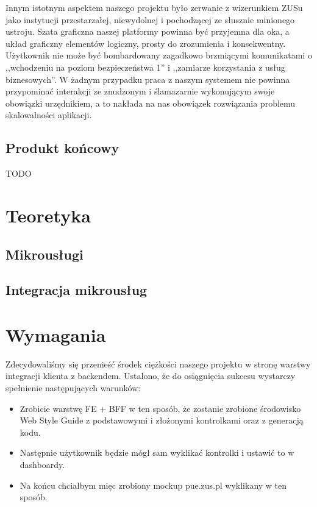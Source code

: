\documentclass[licencjacka]{pracamgr}
\begin{document}
Innym istotnym aspektem naszego projektu było zerwanie z wizerunkiem ZUSu jako
instytucji przestarzałej, niewydolnej i pochodzącej ze słusznie minionego
ustroju. Szata graficzna naszej platformy powinna być przyjemna dla oka, a układ
graficzny elementów logiczny, prosty do zrozumienia i konsekwentny. Użytkownik
nie może być bombardowany zagadkowo brzmiącymi komunikatami o ,,wchodzeniu na
poziom bezpieczeństwa 1'' i ,,zamiarze korzystania z usług biznesowych''. W
żadnym przypadku praca z naszym systemem nie powinna przypominać interakcji
ze znudzonym i ślamazarnie wykonującym swoje obowiązki urzędnikiem, a to
nakłada na nas obowiązek rozwiązania problemu skalowalności aplikacji.

\section{Produkt końcowy}
TODO

\chapter{Teoretyka}

\section{Mikrousługi}

\section{Integracja mikrousług}

\chapter{Wymagania}

Zdecydowaliśmy się przenieść środek ciężkości naszego projektu w stronę warstwy integracji klienta z backendem. Ustalono, że do osiągnięcia sukcesu wystarczy spełnienie następujących warunków: %
\begin{itemize}
	\item Zrobicie warstwę FE + BFF w ten sposób, że zostanie zrobione środowisko Web Style Guide z podstawowymi i złożonymi kontrolkami oraz z generacją kodu.
	\item Następnie użytkownik będzie mógł sam wyklikać kontrolki i ustawić to w dashboardy.
	\item Na końcu chciałbym mięc zrobiony mockup pue.zus.pl wyklikany w ten sposób.
\end{itemize}
\end{document}
